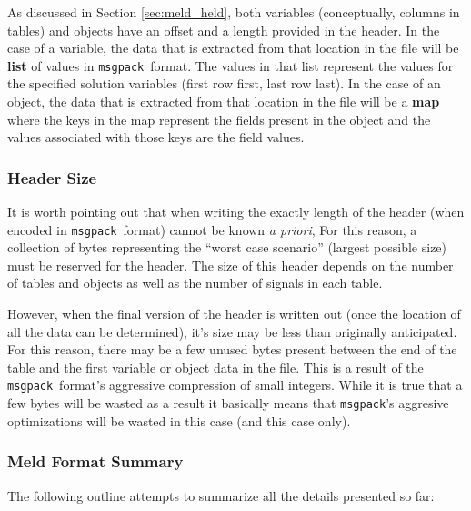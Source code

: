 \documentclass[11pt,a4paper,twocolumn]{article}
\newcommand{\msgpack}{\texttt{msgpack}}
\begin{document}
As discussed in Section \ref{sec:meld_held}, both variables
(conceptually, columns in tables) and objects have an offset and a
length provided in the header.  In the case of a variable, the data
that is extracted from that location in the file will be \textbf{list}
of values in \msgpack\ format.  The values in that list represent the
values for the specified solution variables (first row first, last row
last).  In the case of an object, the data that is extracted from that
location in the file will be a \textbf{map} where the keys in the map
represent the fields present in the object and the values associated
with those keys are the field values.

\subsubsection{Header Size}


It is worth pointing out that when writing the exactly length of the
header (when encoded in \msgpack\ format) cannot be known \textit{a
  priori}, For this reason, a collection of bytes representing the
``worst case scenario'' (largest possible size) must be reserved for
the header.  The size of this header depends on the number of tables
and objects as well as the number of signals in each table.

However, when the final version of the header is written out (once the
location of all the data can be determined), it's size may be less
than originally anticipated.  For this reason, there may be a few
unused bytes present between the end of the table and the first
variable or object data in the file.  This is a result of the
\msgpack\ format's aggressive compression of small integers.  While it
is true that a few bytes will be wasted as a result it basically means
that \msgpack's aggresive optimizations will be wasted in this case
(and this case only).

\subsubsection{Meld Format Summary}

The following outline attempts to summarize all the details presented so
far:
\end{document}
